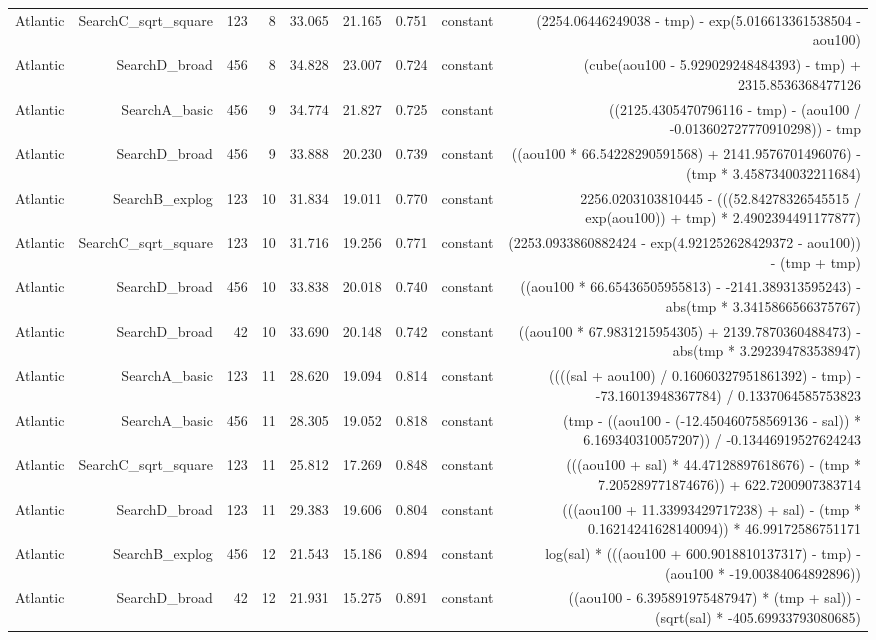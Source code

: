 \begin{table}
{\begin{tabular}{lrrrrrrrr}
Atlantic & SearchC\_sqrt\_square & 123 & 8 & 33.065 & 21.165 & 0.751 & constant & (2254.06446249038 - tmp) - exp(5.016613361538504 - aou100) \\
Atlantic & SearchD\_broad & 456 & 8 & 34.828 & 23.007 & 0.724 & constant & (cube(aou100 - 5.929029248484393) - tmp) + 2315.8536368477126 \\
Atlantic & SearchA\_basic & 456 & 9 & 34.774 & 21.827 & 0.725 & constant & ((2125.4305470796116 - tmp) - (aou100 / -0.013602727770910298)) - tmp \\
Atlantic & SearchD\_broad & 456 & 9 & 33.888 & 20.230 & 0.739 & constant & ((aou100 * 66.54228290591568) + 2141.9576701496076) - (tmp * 3.4587340032211684) \\
Atlantic & SearchB\_explog & 123 & 10 & 31.834 & 19.011 & 0.770 & constant & 2256.0203103810445 - (((52.84278326545515 / exp(aou100)) + tmp) * 2.4902394491177877) \\
Atlantic & SearchC\_sqrt\_square & 123 & 10 & 31.716 & 19.256 & 0.771 & constant & (2253.0933860882424 - exp(4.921252628429372 - aou100)) - (tmp + tmp) \\
Atlantic & SearchD\_broad & 456 & 10 & 33.838 & 20.018 & 0.740 & constant & ((aou100 * 66.65436505955813) - -2141.389313595243) - abs(tmp * 3.3415866566375767) \\
Atlantic & SearchD\_broad & 42 & 10 & 33.690 & 20.148 & 0.742 & constant & ((aou100 * 67.9831215954305) + 2139.7870360488473) - abs(tmp * 3.292394783538947) \\
Atlantic & SearchA\_basic & 123 & 11 & 28.620 & 19.094 & 0.814 & constant & ((((sal + aou100) / 0.16060327951861392) - tmp) - -73.16013948367784) / 0.1337064585753823 \\
Atlantic & SearchA\_basic & 456 & 11 & 28.305 & 19.052 & 0.818 & constant & (tmp - ((aou100 - (-12.450460758569136 - sal)) * 6.169340310057207)) / -0.13446919527624243 \\
Atlantic & SearchC\_sqrt\_square & 123 & 11 & 25.812 & 17.269 & 0.848 & constant & (((aou100 + sal) * 44.47128897618676) - (tmp * 7.205289771874676)) + 622.7200907383714 \\
Atlantic & SearchD\_broad & 123 & 11 & 29.383 & 19.606 & 0.804 & constant & (((aou100 + 11.33993429717238) + sal) - (tmp * 0.16214241628140094)) * 46.99172586751171 \\
Atlantic & SearchB\_explog & 456 & 12 & 21.543 & 15.186 & 0.894 & constant & log(sal) * (((aou100 + 600.9018810137317) - tmp) - (aou100 * -19.00384064892896)) \\
Atlantic & SearchD\_broad & 42 & 12 & 21.931 & 15.275 & 0.891 & constant & ((aou100 - 6.395891975487947) * (tmp + sal)) - (sqrt(sal) * -405.69933793080685) \\

\end{tabular}}
\end{table}
